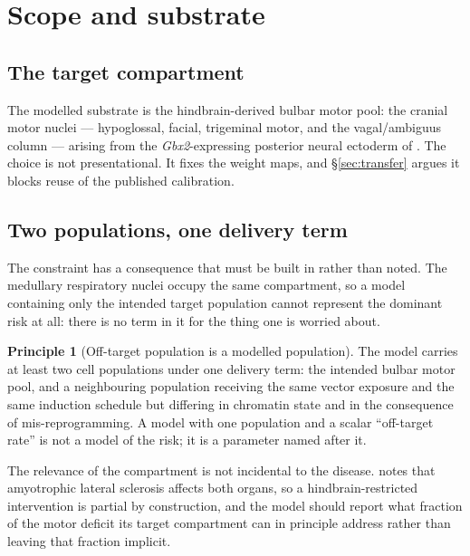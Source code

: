 \documentclass[11pt,a4paper]{article}
\theoremstyle{plain}
\theoremstyle{definition}
\newtheorem{principle}[theorem]{Principle}
\theoremstyle{remark}
\begin{document}
\section{Scope and substrate}\label{sec:scope}

\subsection{The target compartment}

The modelled substrate is the hindbrain-derived bulbar motor pool: the cranial
motor nuclei --- hypoglossal, facial, trigeminal motor, and the
vagal/ambiguus column --- arising from the \emph{Gbx2}-expressing posterior
neural ectoderm of \cite{TwoOrgans}. The choice is not presentational. It
fixes the weight maps, and \S\ref{sec:transfer} argues it blocks reuse of the
published calibration.

\subsection{Two populations, one delivery term}

The constraint has a consequence that must be built in rather than noted. The
medullary respiratory nuclei occupy the same compartment, so a model
containing only the intended target population cannot represent the dominant
risk at all: there is no term in it for the thing one is worried about.

\begin{principle}[Off-target population is a modelled population]
\label{prin:offtarget}
The model carries at least two cell populations under one delivery term: the
intended bulbar motor pool, and a neighbouring population receiving the same
vector exposure and the same induction schedule but differing in chromatin
state and in the consequence of mis-reprogramming. A model with one population
and a scalar ``off-target rate'' is not a model of the risk; it is a parameter
named after it.
\end{principle}

The relevance of the compartment is not incidental to the disease.
\cite{TwoOrgans} notes that amyotrophic lateral sclerosis affects both organs,
so a hindbrain-restricted intervention is partial by construction, and the
model should report what fraction of the motor deficit its target compartment
can in principle address rather than leaving that fraction implicit.
\end{document}
